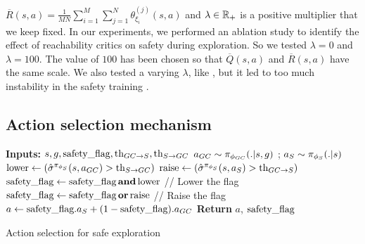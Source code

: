 $\overline{R}(s, a) = \frac{1}{M N} \sum_{i = 1}^{M} \sum_{j = 1}^{N} \theta_{\xi_i}^{(j)}(s, a)$ and $\lambda \in \mathbb{R}_+$ is
a positive multiplier that we keep fixed. In our experiments, we performed an ablation study to identify the effect of 
reachability critics on safety during exploration. So we tested $\lambda = 0$ and $\lambda = 100$. The value of $100$
has been chosen so that $\overline{Q}(s, a)$ and $\overline{R}(s, a)$ have the same scale. We also tested a varying $\lambda$, 
like \citeauthor{ha2020SACLagLevine}, but it led to too much instability in the safety training \cite{ha2020SACLagLevine}.

\subsection{Action selection mechanism}
\label{subsection:Action selection mechanism}

\begin{algorithm}[H]
    \begin{algorithmic}[1]
    \STATE \textbf{Inputs:} $s, g, \text{safety}\_\text{flag}, \text{th}_{GC \rightarrow S}, \text{th}_{S \rightarrow GC}$ 
    \STATE $a_{GC} \sim \pi_{\phi_{GC}}(.|s, g)$ ; $a_S \sim \pi_{\phi_S}(.|s)$
    \STATE $\text{lower} \leftarrow (\hat{\sigma}^{\pi_{\phi_S}}(s, a_{GC}) > \text{th}_{S \rightarrow GC})$
    \STATE $\text{raise} \leftarrow (\hat{\sigma}^{\pi_{\phi_S}}(s, a_S) > \text{th}_{GC \rightarrow S})$
    \STATE $\text{safety}\_\text{flag} \leftarrow \text{safety}\_\text{flag} \, \text{\textbf{and}} \, \text{lower}$ \hfill // Lower the flag
    \STATE $\text{safety}\_\text{flag} \leftarrow \text{safety}\_\text{flag} \, \text{\textbf{or}} \, \text{raise}$  \hfill // Raise the flag
    \STATE $a \leftarrow \text{safety}\_\text{flag} . a_S + (1 - \text{safety}\_\text{flag}) . a_{GC}$
    \STATE \textbf{Return} $a$, $\text{safety}\_\text{flag}$
    \end{algorithmic}
    \caption{Action selection for safe exploration}
    \label{alg:Action selection}
\end{algorithm}

